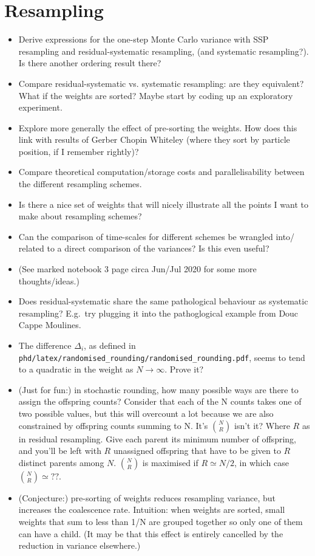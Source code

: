 \documentclass{article}
\begin{document}
\section*{Resampling}
\begin{itemize}
\item Derive expressions for the one-step Monte Carlo variance with SSP resampling and residual-systematic resampling, (and systematic resampling?). Is there another ordering result there?
\item Compare residual-systematic vs. systematic resampling: are they equivalent? What if the weights are sorted? Maybe start by coding up an exploratory experiment.
\item Explore more generally the effect of pre-sorting the weights. How does this link with results of Gerber Chopin Whiteley (where they sort by particle position, if I remember rightly)?
\item Compare theoretical computation/storage costs and parallelisability between the different resampling schemes.
\item Is there a nice set of weights that will nicely illustrate all the points I want to make about resampling schemes?
\item Can the comparison of time-scales for different schemes be wrangled into/ related to a direct comparison of the variances? Is this even useful?
\item (See marked notebook 3 page circa Jun/Jul 2020 for some more thoughts/ideas.)
\item Does residual-systematic share the same pathological behaviour as systematic resampling? E.g.\ try plugging it into the pathoglogical example from Douc Cappe Moulines.
\item The difference $\Delta_i$, as defined in \texttt{phd/latex/randomised\_rounding/randomised\_rounding.pdf}, seems to tend to a quadratic in the weight as $N\to\infty$. Prove it?
\item (Just for fun:) in stochastic rounding, how many possible ways are there to assign the offspring counts? Consider that each of the N counts takes one of two possible values, but this will overcount a lot because we are also constrained by offspring counts summing to N. It's $\binom{N}{R}$ isn't it? Where $R$ as in residual resampling. Give each parent its minimum number of offspring, and you'll be left with $R$ unassigned offspring that have to be given to $R$ distinct parents among $N$. $\binom{N}{R}$ is maximised if $R\simeq N/2$, in which case $\binom{N}{R}\simeq ??$.
\item (Conjecture:) pre-sorting of weights reduces resampling variance, but increases the coalescence rate. Intuition: when weights are sorted, small weights that sum to less than 1/N are grouped together so only one of them can have a child. (It may be that this effect is entirely cancelled by the reduction in variance elsewhere.)
\end{itemize}
\end{document}
